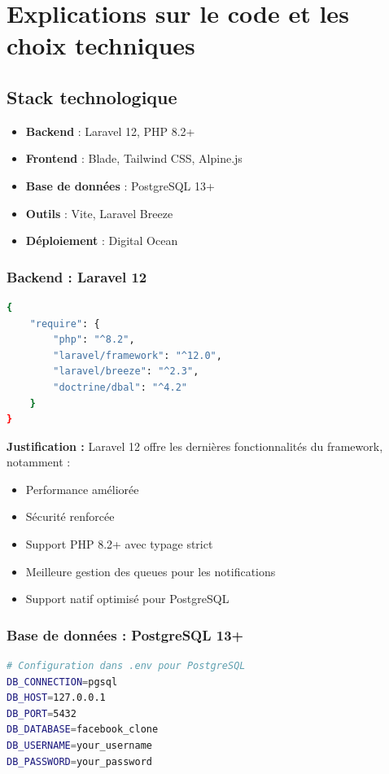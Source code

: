 \documentclass[12pt,a4paper]{article}
\begin{document}
\section{Explications sur le code et les choix techniques}

\subsection{Stack technologique}

\begin{itemize}
    \item \textbf{Backend} : Laravel 12, PHP 8.2+
    \item \textbf{Frontend} : Blade, Tailwind CSS, Alpine.js
    \item \textbf{Base de donn\'ees} : PostgreSQL 13+
    \item \textbf{Outils} : Vite, Laravel Breeze
    \item \textbf{D\'eploiement} : Digital Ocean
\end{itemize}

\subsubsection{Backend : Laravel 12}
\begin{lstlisting}[language=bash]
{
    "require": {
        "php": "^8.2",
        "laravel/framework": "^12.0",
        "laravel/breeze": "^2.3",
        "doctrine/dbal": "^4.2"
    }
}
\end{lstlisting}

\textbf{Justification :} Laravel 12 offre les derni\`eres fonctionnalit\'es du framework, notamment :
\begin{itemize}
    \item Performance am\'elior\'ee
    \item S\'ecurit\'e renforc\'ee
    \item Support PHP 8.2+ avec typage strict
    \item Meilleure gestion des queues pour les notifications
    \item Support natif optimis\'e pour PostgreSQL
\end{itemize}

\subsubsection{Base de donn\'ees : PostgreSQL 13+}
\begin{lstlisting}[language=bash]
# Configuration dans .env pour PostgreSQL
DB_CONNECTION=pgsql
DB_HOST=127.0.0.1
DB_PORT=5432
DB_DATABASE=facebook_clone
DB_USERNAME=your_username
DB_PASSWORD=your_password
\end{lstlisting}
\end{document}
